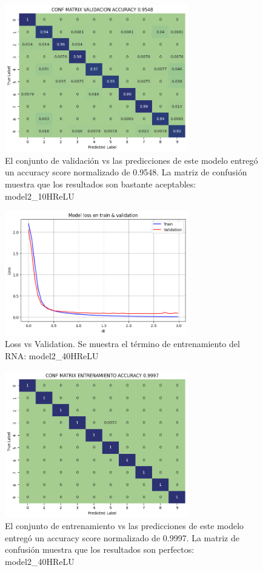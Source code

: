 \documentclass[journal]{IEEEtai}
\begin{document}
\begin{figure}[H]
\centering
\includegraphics[width=8cm]{img/model210HReLU/val.png}
\caption{El conjunto de validación vs las predicciones de este modelo entregó un accuracy score normalizado de  0.9548. La matriz de confusión muestra que los resultados son bastante aceptables: model2\_10HReLU}
\label{fig: model210HReLUVAL}
\end{figure}

\begin{figure}[H]
\centering
\includegraphics[width=8cm]{img/model240HReLU/lossvsval.png}
\caption{Loss vs Validation. Se muestra el término de entrenamiento del RNA: model2\_40HReLU}
\label{fig: model240HReLULOSSVSVAL}
\end{figure}

\begin{figure}[H]
\centering
\includegraphics[width=8cm]{img/model240HReLU/train.png}
\caption{El conjunto de entrenamiento vs las predicciones de este modelo entregó un accuracy score normalizado de  0.9997. La matriz de confusión muestra que los resultados son perfectos: model2\_40HReLU}
\label{fig: model240HReLUTRAIN}
\end{figure}
\end{document}
